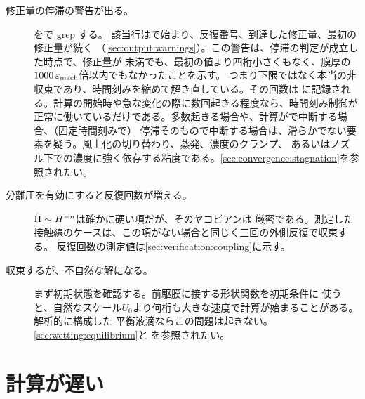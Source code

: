 \begin{description}
  \item[修正量の停滞の警告が出る。] をで grep する。
    該当行はで始まり、反復番号、到達した修正量、最初の修正量が続く
    （\cref{sec:output:warnings}）。この警告は、停滞の判定が成立した時点で、修正量が
    未満でも、最初の値より四桁小さくもなく、膜厚の$1000\,\varepsilon_{\mathrm{mach}}$倍以内でもなかったことを示す。
    つまり下限ではなく本当の非収束であり、時間刻みを縮めて解き直している。その回数は
    に記録される。計算の開始時や急な変化の際に数回起きる程度なら、時間刻み制御が
    正常に働いているだけである。多数起きる場合や、計算がで中断する場合、（固定時間刻みで）
    停滞そのもので中断する場合は、滑らかでない要素を疑う。風上化の切り替わり、蒸発、濃度のクランプ、
    あるいはノズル下での濃度に強く依存する粘度である。\cref{sec:convergence:stagnation}を参照されたい。
  \item[分離圧を有効にすると反復回数が増える。] $\hat{\Pi} \sim H^{-n}$は確かに硬い項だが、そのヤコビアンは
    厳密である。測定した接触線のケースは、この項がない場合と同じく三回の外側反復で収束する。
    反復回数の測定値は\cref{sec:verification:coupling}に示す。
  \item[収束するが、不自然な解になる。] まず初期状態を確認する。前駆膜に接する形状関数を初期条件に
    使うと、自然なスケール$U_0$より何桁も大きな速度で計算が始まることがある。解析的に構成した
    平衡液滴ならこの問題は起きない。\cref{sec:wetting:equilibrium}と
    を参照されたい。
\end{description}

\section{計算が遅い}
\label{sec:trouble:slow}

